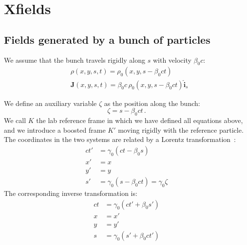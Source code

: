 \chapter{Xfields}


\section{Fields generated by a bunch of particles}



We assume that the bunch travels rigidly along $s$ with velocity $\beta_0 c$:
\begin{align}
&\rho\left(x, y, s, t\right) = \rho_0\left(x, y, s - \beta_0 ct\right) \label{rhorho0}\\
&\textbf{J}\left(x, y, s, t\right) = \beta_0c\, \rho_0\left(x, y, s - \beta_0 ct\right)  \hat{\textbf{i}}_s \label{JJ0}
\end{align}

We define an auxiliary variable $\zeta$ as the position along the bunch:
\begin{equation}
\zeta = s -\beta_0 c t \, .\label{zetadef}
\end{equation}
We call $K$ the lab reference frame in which we have defined all equations above, and we introduce a boosted frame $K'$ moving rigidly with the reference particle.
The coordinates in the two systems are related by a Lorentz transformation~\cite{jackson}:
\begin{align}
ct' &= \gamma_0 \left(ct -\beta_0 s \right)\label{lorA}\\
x' &= x\label{lorX}\\
y' &= y\label{lorY}\\
s' &= \gamma_0 \left(s -\beta_0 ct \right) = \gamma_0 \zeta\label{lorB}
\end{align}
The  corresponding inverse transformation is:
\begin{align}
ct &= \gamma_0 \left(ct' +\beta_0 s' \right)\label{lorC}\\
x &= x'\label{lorXinv}\\
y &= y'\label{lorYinv}\\
s &= \gamma_0 \left(s' +\beta_0 ct' \right)\label{lorD}
\end{align}



